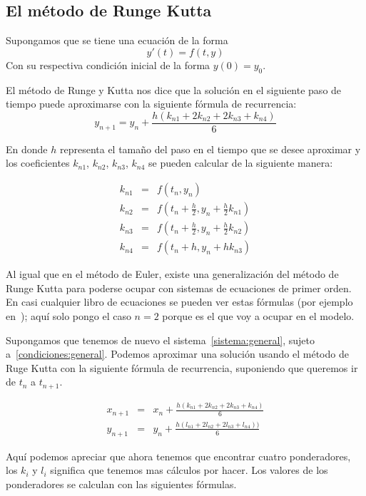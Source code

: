 \subsection{El método de Runge Kutta}
Supongamos que se tiene una ecuación de la forma
$$y'(t) = f(t, y)$$
Con su respectiva condición inicial de la forma $y(0)=y_0$.

El método de Runge y Kutta nos dice que la solución en el siguiente paso de tiempo puede aproximarse con la siguiente fórmula de recurrencia:
$$y_{n+1} = y_n + \frac{h \left(k_{n1} + 2k_{n2} + 2k_{n3} + k_{n4} \right)}{6} $$
 
En donde $h$ representa el tamaño del paso en el tiempo que se desee aproximar y los coeficientes $k_{n1}$, $k_{n2}$, $k_{n3}$, $k_{n4}$ se pueden calcular de la siguiente manera:

\begin{eqnarray}
k_{n1} & = & f(t_n, y_n) \nonumber \\
k_{n2} & = & f(t_n + \frac{h}{2}, y_n + \frac{h}{2} k_{n1}) \nonumber \\
k_{n3} & = & f(t_n + \frac{h}{2}, y_n + \frac{h}{2} k_{n2}) \nonumber \\
k_{n4} & = & f(t_n + h, y_n + hk_{n3}) \nonumber
\end{eqnarray}

Al igual que en el método de Euler, existe una generalización del método de Runge Kutta para poderse ocupar con sistemas de ecuaciones de primer orden. En casi cualquier libro de ecuaciones se pueden ver estas fórmulas (por ejemplo en~\cite{Blanchard:Ecuaciones}); aquí solo pongo el caso $n=2$ porque es el que voy a ocupar en el modelo.

Supongamos que tenemos de nuevo el sistema~\ref{sistema:general}, sujeto a~\ref{condiciones:general}. Podemos aproximar una solución usando el método de Ruge Kutta con la siguiente fórmula de recurrencia, suponiendo que queremos ir de $t_n$ a $t_{n+1}$.

\begin{eqnarray}
x_{n+1} & = & x_n + \frac{h(k_{n1} + 2k_{n2} + 2k_{n3} + k_{n4})}{6} \nonumber \\
y_{n+1} & = & y_n + \frac{h(l_{n1} + 2l_{n2} + 2l_{n3} + l_{n4}))}{6} \nonumber
\end{eqnarray}

Aquí podemos apreciar que ahora tenemos que encontrar cuatro ponderadores, los $k_i$ y $l_i$ significa que tenemos mas cálculos por hacer. Los valores de los ponderadores se calculan con las siguientes fórmulas.

